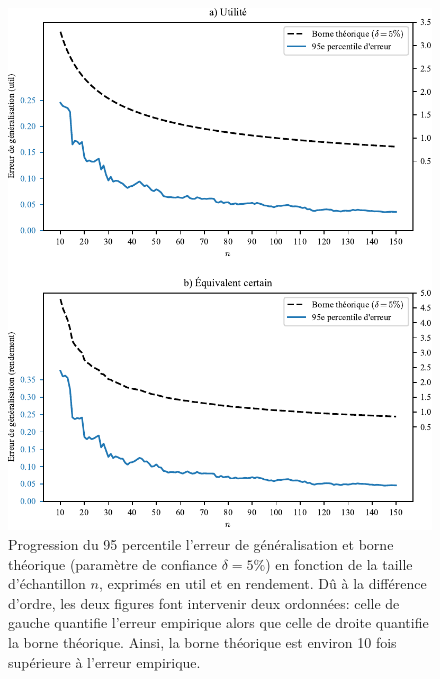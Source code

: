 \begin{figure}[h!]
  \centering
  \includegraphics[width=\textwidth]{../experiments/fig/bound_errgen.pdf}
  \caption[Borne théorique sur l'erreur de généralisation]{Progression du 95\ieme
    percentile l'erreur de généralisation et borne théorique (paramètre de confiance
    $\delta = 5\%$) en fonction de la taille d'échantillon $n$, exprimés en util et en
    rendement. Dû à la différence d'ordre, les deux figures font intervenir deux
    ordonnées: celle de gauche quantifie l'erreur empirique alors que celle de droite
    quantifie la borne théorique. Ainsi, la borne théorique est environ 10 fois supérieure
    à l'erreur empirique.}
  \label{fig_bound_errgen}
\end{figure}

